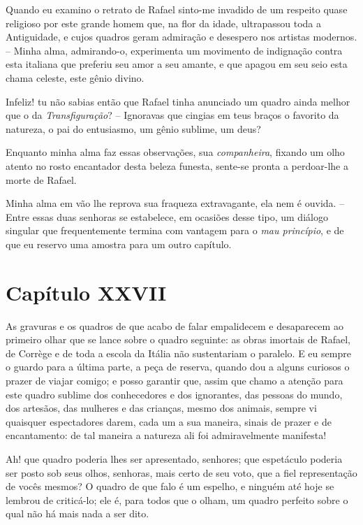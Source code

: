  Quando eu examino o retrato de Rafael sinto-me invadido de um respeito
quase religioso por este grande homem que, na flor da idade,
ultrapassou toda a Antiguidade, e cujos quadros geram admiração e
desespero nos artistas modernos. -- Minha alma, admirando-o,
experimenta um movimento de indignação contra esta italiana que
preferiu seu amor a seu amante, e que apagou em seu seio esta chama
celeste, este gênio divino.

 Infeliz! tu não sabias então que Rafael tinha anunciado um quadro ainda
melhor que o da \textit{Transfiguração}? -- Ignoravas que cingias em
teus braços o favorito da natureza, o pai do entusiasmo, um gênio
sublime, um deus?

 Enquanto minha alma faz essas observações, sua \textit{companheira},
fixando um olho atento no rosto encantador desta beleza funesta,
sente-se pronta a perdoar-lhe a morte de Rafael.

 Minha alma em vão lhe reprova sua fraqueza extravagante, ela nem é
ouvida. -- Entre essas duas senhoras se estabelece, em ocasiões desse
tipo, um diálogo singular que frequentemente termina com vantagem para
o \textit{mau princípio}, e de que eu reservo uma amostra para um outro
capítulo.

\section*{Capítulo XXVII}

 As gravuras e os quadros de que acabo de falar empalidecem e
desaparecem ao primeiro olhar que se lance sobre o quadro seguinte: as
obras imortais de Rafael, de Corrège e de toda a escola da Itália não
sustentariam o paralelo. E eu sempre o guardo para a última parte, a
peça de reserva, quando dou a alguns curiosos o prazer de viajar
comigo; e posso garantir que, assim que chamo a atenção para este
quadro sublime dos conhecedores e dos ignorantes, das pessoas do mundo,
dos artesãos, das mulheres e das crianças, mesmo dos animais, sempre vi
quaisquer espectadores darem, cada um a sua maneira, sinais de prazer e
de encantamento: de tal maneira a natureza ali foi admiravelmente
manifesta!

 Ah! que quadro poderia lhes ser apresentado, senhores; que espetáculo
poderia ser posto sob seus olhos, senhoras, mais certo de seu voto, que
a fiel representação de vocês mesmos? O quadro de que falo é um
espelho, e ninguém até hoje se lembrou de criticá-lo; ele é, para todos
que o olham, um quadro perfeito sobre o qual não há mais nada a ser
dito.

